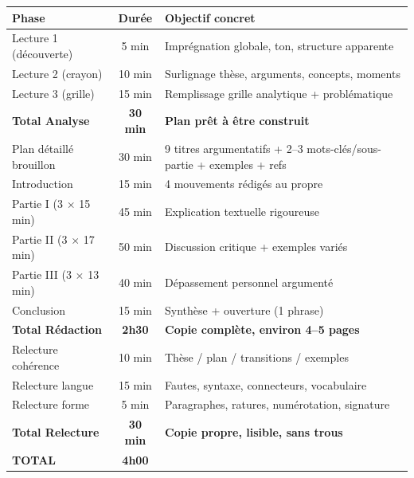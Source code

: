 \documentclass[11pt]{article}
\begin{document}
\begin{exemplebox}
\begin{center}
\begin{tabularx}{\linewidth}{|l|c|X|}\hline
\textbf{Phase} & \textbf{Durée} & \textbf{Objectif concret} \\ \hline
Lecture 1 (découverte) & 5 min & Imprégnation globale, ton, structure apparente \\ \hline
Lecture 2 (crayon) & 10 min & Surlignage thèse, arguments, concepts, moments \\ \hline
Lecture 3 (grille) & 15 min & Remplissage grille analytique + problématique \\ \hline
\textbf{Total Analyse} & \textbf{30 min} & \textbf{Plan prêt à être construit} \\ \hline
Plan détaillé brouillon & 30 min & 9 titres argumentatifs + 2--3 mots-clés/sous-partie + exemples + refs \\ \hline
Introduction & 15 min & 4 mouvements rédigés au propre \\ \hline
Partie I (3 $\times$ 15 min) & 45 min & Explication textuelle rigoureuse \\ \hline
Partie II (3 $\times$ 17 min) & 50 min & Discussion critique + exemples variés \\ \hline
Partie III (3 $\times$ 13 min) & 40 min & Dépassement personnel argumenté \\ \hline
Conclusion & 15 min & Synthèse + ouverture (1 phrase) \\ \hline
\textbf{Total Rédaction} & \textbf{2h30} & \textbf{Copie complète, environ 4--5 pages} \\ \hline
Relecture cohérence & 10 min & Thèse / plan / transitions / exemples \\ \hline
Relecture langue & 15 min & Fautes, syntaxe, connecteurs, vocabulaire \\ \hline
Relecture forme & 5 min & Paragraphes, ratures, numérotation, signature \\ \hline
\textbf{Total Relecture} & \textbf{30 min} & \textbf{Copie propre, lisible, sans trous} \\ \hline
\textbf{TOTAL} & \textbf{4h00} &  \\ \hline
\end{tabularx}
\end{center}
\end{exemplebox}
\end{document}
